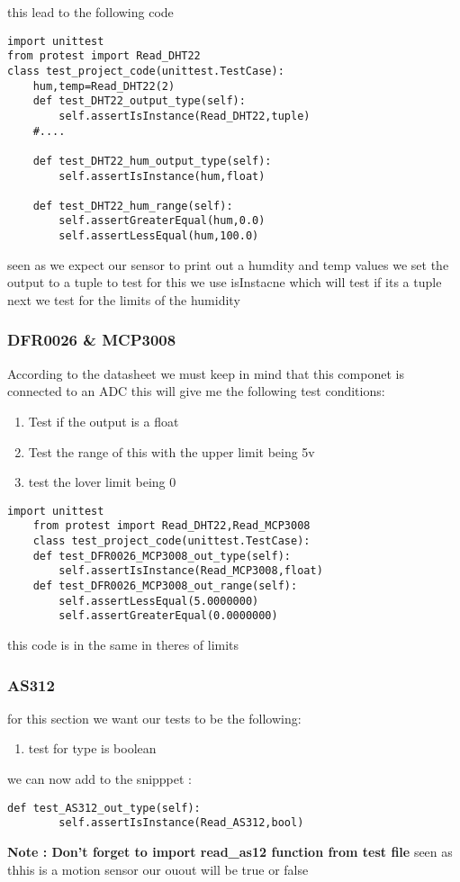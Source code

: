 this lead to the  following code 
\begin{lstlisting}[style=mystyle,caption={sample test for DHT22}]
import unittest
from protest import Read_DHT22
class test_project_code(unittest.TestCase):
    hum,temp=Read_DHT22(2)
    def test_DHT22_output_type(self):
        self.assertIsInstance(Read_DHT22,tuple)
    #....

    def test_DHT22_hum_output_type(self):
        self.assertIsInstance(hum,float)

    def test_DHT22_hum_range(self):
        self.assertGreaterEqual(hum,0.0)
        self.assertLessEqual(hum,100.0)
\end{lstlisting}
seen as we expect our sensor to  print out a humdity and temp values we  set the  output to  a tuple 
to test for this we use isInstacne which will test if its a tuple
next we test for the  limits of the  humidity
\subsubsection{DFR0026 \& MCP3008}
According to the  datasheet \cite{ada} we must keep in mind  that this  componet is  connected to  an ADC 
this  will  give  me  the  following  test conditions:
\begin{enumerate}
    \item Test if  the output is a float

    \item Test  the  range of this  with the  upper limit being 5v 
    \item test the  lover limit being 0 
\end{enumerate}
\begin{lstlisting}[style=mystyle,caption={unit test for  DFR0026 and  MCP3008}]
    import unittest
    from protest import Read_DHT22,Read_MCP3008
    class test_project_code(unittest.TestCase):
    def test_DFR0026_MCP3008_out_type(self):
        self.assertIsInstance(Read_MCP3008,float)
    def test_DFR0026_MCP3008_out_range(self):
        self.assertLessEqual(5.0000000)
        self.assertGreaterEqual(0.0000000)
\end{lstlisting}
this code is in the same in theres of limits
\subsubsection{AS312}
for  this section  we  want our  tests  to  be  the following:
\begin{enumerate}
    \item test for type is boolean 
\end{enumerate}
we can  now add to the snipppet :
\begin{lstlisting}[style=mystyle,caption={unit test for AS312}]
    def test_AS312_out_type(self):
        self.assertIsInstance(Read_AS312,bool)
\end{lstlisting}
\textbf{Note : Don't forget to import read_as12 function from test file}
seen as  thhis is a motion sensor  our ouout will be true or false
